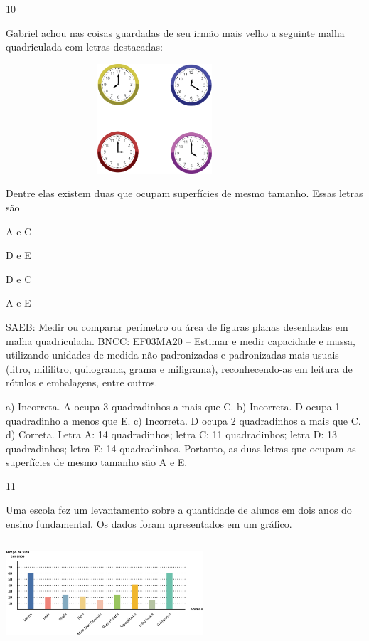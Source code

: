 {\begin{escolha}
{\num{10}

Gabriel achou nas coisas guardadas de seu irmão mais velho a seguinte malha quadriculada com letras destacadas:


\includegraphics[width=4.36538in,height=1.60417in]{media/image111.png}

Dentre elas existem duas que ocupam superfícies de mesmo tamanho. Essas letras são

\begin{escolha}
\item
  A e C
\item
  D e E
\item
  D e C
\item
  A e E
\end{escolha}

SAEB: Medir ou comparar perímetro ou área de figuras planas
desenhadas em malha quadriculada.
BNCC: EF03MA20 -- Estimar e medir capacidade e massa, utilizando unidades de medida não
padronizadas e padronizadas mais usuais (litro, mililitro, quilograma, grama e miligrama),
reconhecendo-as em leitura de rótulos e embalagens, entre outros.

a) Incorreta. A ocupa 3 quadradinhos a mais que C.
b) Incorreta. D ocupa 1 quadradinho a menos que E.
c) Incorreta. D ocupa 2 quadradinhos a mais que C.
d) Correta. Letra A: 14 quadradinhos; letra C: 11 quadradinhos; letra D: 13 quadradinhos; letra E: 14 quadradinhos. Portanto, as duas letras que ocupam as superfícies de mesmo tamanho são A e E.

\num{11}

Uma escola fez um levantamento sobre a quantidade de alunos em dois anos
do ensino fundamental. Os dados foram apresentados em um gráfico.


\includegraphics[width=2.89744in,height=1.52156in]{media/image112.png}

}
\end{escolha}}
